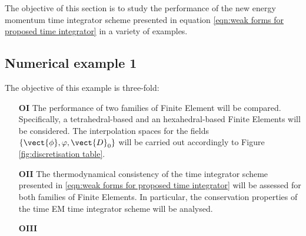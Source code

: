 
The objective of this section is to study the performance of the new energy momentum time integrator scheme presented in equation \eqref{eqn:weak forms for proposed time integrator} in a variety of examples.



\subsection{Numerical example 1}\label{s:example-bend-fix}

The objective of this example is three-fold: 

\vspace{-2mm}
\begin{itemize}
	\item [\textbf{OI}] The performance of two families of Finite Element will be compared. Specifically, a tetrahedral-based  and an hexahedral-based Finite Elements will be considered. The interpolation spaces for the fields $\{\vect{\phi},\varphi,\vect{D}_0\}$ will be carried out accordingly to Figure \ref{fig:discretisation table}.
	
	\item [\textbf{OII}] The thermodynamical consistency of the time integrator scheme presented in \eqref{eqn:weak forms for proposed time integrator} will be assessed for both families of Finite Elements. In particular, the conservation properties of the time EM time integrator scheme will be analysed. 
	
	\item [\textbf{OIII}] %
	
\end{itemize}

